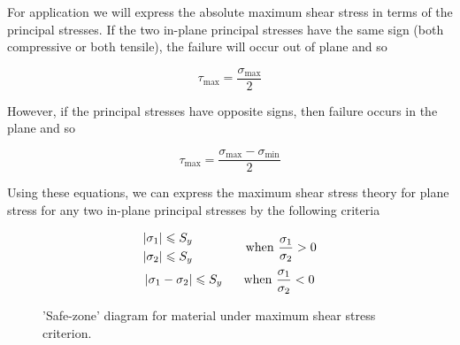 \documentclass[
10pt,
a4paper,
openany,
svgnames,
]{book} %
\begin{document}
For application we will express the absolute maximum shear stress in terms of the principal stresses. If the two in-plane principal stresses have the same sign (both compressive or both tensile), the failure will occur out of plane and so

\begin{equation}
  \tau _{\max } = \frac{\sigma _{\max }}{2}
\end{equation}

However, if the principal stresses have opposite signs, then failure occurs in the plane and so

\begin{equation}
  \tau _{\max } = \frac{\sigma_{\max } - \sigma _{\min }}{2}
\end{equation}

Using these equations, we can express the maximum shear stress theory for plane stress for any two in-plane principal stresses by the following criteria

\begin{equation}
  \begin{gathered}
    \begin{gathered}
      \left| \sigma_1 \right| \leqslant S_y \hfill \\
      \left| \sigma_2 \right| \leqslant S_y \hfill \\ 
    \end{gathered}  \hspace{1.5cm} \text{when } \dfrac{\sigma _1}{\sigma _2} > 0  \\
    \left| \sigma _1 - \sigma _2 \right| \leqslant S_y \hspace{0.6cm} \text{when } \dfrac{\sigma _1}{\sigma _2} < 0 \\ 
  \end{gathered}
\end{equation}

\begin{figure}[h]
  \centering
  \caption{'Safe-zone' diagram for material under maximum shear stress criterion.}
  \label{fig: MSST safe zone}
\end{figure}
\end{document}
